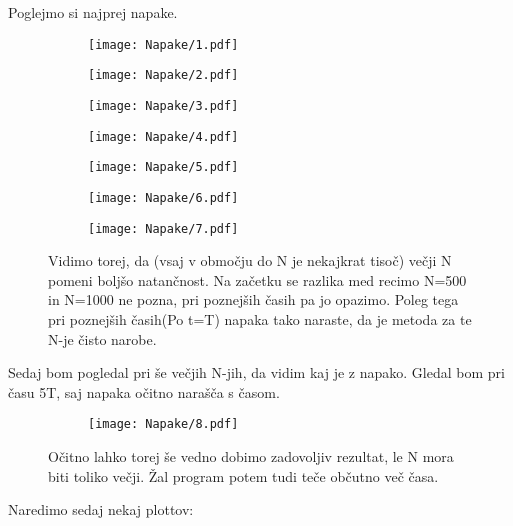 \documentclass{article}
\begin{document}
Poglejmo si najprej napake.
\newpage

\begin{figure}[H]
\begin{subfigure}{.5\textwidth}
\texttt{[image: Napake/1.pdf]}
\end{subfigure}
\begin{subfigure}{.5\textwidth}
\texttt{[image: Napake/2.pdf]}
\end{subfigure}
\end{figure}

\begin{figure}[H]
\begin{subfigure}{.5\textwidth}
\texttt{[image: Napake/3.pdf]}
\end{subfigure}
\begin{subfigure}{.5\textwidth}
\texttt{[image: Napake/4.pdf]}
\end{subfigure}
\end{figure}

\begin{figure}[H]
\begin{subfigure}{.5\textwidth}
\texttt{[image: Napake/5.pdf]}
\end{subfigure}
\begin{subfigure}{.5\textwidth}
\texttt{[image: Napake/6.pdf]}
\end{subfigure}
\end{figure}

\begin{figure}[H]
\centering
\begin{subfigure}{.5\textwidth}
\texttt{[image: Napake/7.pdf]}
\end{subfigure}
\caption*{Vidimo torej, da (vsaj v območju do N je nekajkrat tisoč) večji N pomeni boljšo natančnost. Na začetku se razlika med recimo N=500 in N=1000 ne pozna, pri poznejših časih pa jo opazimo. Poleg tega pri poznejših časih(Po t=T) napaka tako naraste, da je metoda za te N-je čisto narobe.}
\end{figure}

Sedaj bom pogledal pri še večjih N-jih, da vidim kaj je z napako. Gledal bom pri času 5T, saj napaka očitno narašča s časom.

\begin{figure}[H]
\centering
\begin{subfigure}{.5\textwidth}
\texttt{[image: Napake/8.pdf]}
\end{subfigure}
\caption*{Očitno lahko torej še vedno dobimo zadovoljiv rezultat, le N mora biti toliko večji. Žal program potem tudi teče občutno več časa.}
\end{figure}
\newpage
Naredimo sedaj nekaj plottov:
\end{document}
